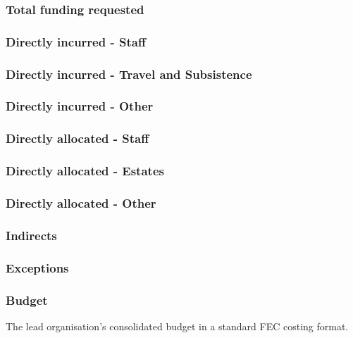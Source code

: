 \documentclass[12pt]{article}
\begin{document}
\subsubsection*{Total funding requested}

\subsubsection*{Directly incurred - Staff}

\subsubsection*{Directly incurred - Travel and Subsistence}

\subsubsection*{Directly incurred - Other}

\subsubsection*{Directly allocated - Staff}

\subsubsection*{Directly allocated - Estates}

\subsubsection*{Directly allocated - Other}

\subsubsection*{Indirects}

\subsubsection*{Exceptions}

\subsubsection*{Budget}

The lead organisation's consolidated budget in a standard FEC costing format.



\end{document}
